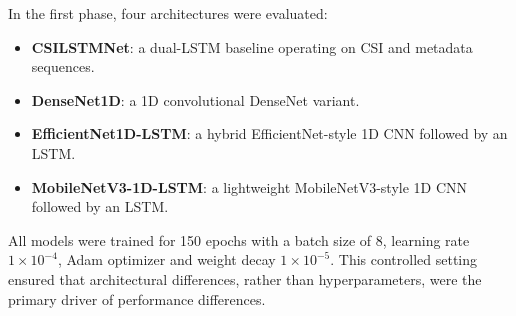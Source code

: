 In the first phase, four architectures were evaluated:

\begin{itemize}
    \item \textbf{CSILSTMNet}: a dual-LSTM baseline operating on CSI and
          metadata sequences.
    \item \textbf{DenseNet1D}: a 1D convolutional DenseNet variant.
    \item \textbf{EfficientNet1D-LSTM}: a hybrid EfficientNet-style 1D CNN
          followed by an LSTM.
    \item \textbf{MobileNetV3-1D-LSTM}: a lightweight MobileNetV3-style 1D CNN
          followed by an LSTM.
\end{itemize}

All models were trained for 150 epochs with a batch size of $8$, learning
rate $1\times 10^{-4}$, Adam optimizer and weight decay
$1\times 10^{-5}$. This controlled setting ensured that architectural
differences, rather than hyperparameters, were the primary driver of
performance differences.

